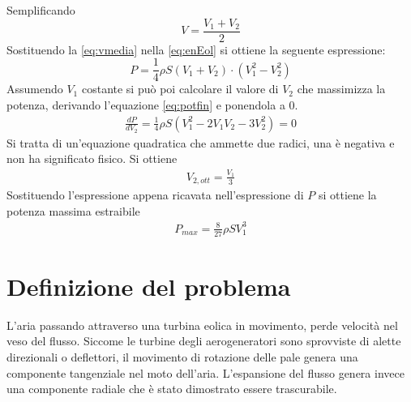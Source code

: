 Semplificando 
\begin{equation}\label{eq:vmedia}
V = \frac{V_1 + V_2}{2}
\end{equation}
Sostituendo la \ref{eq:vmedia} nella \ref{eq:enEol} si ottiene la seguente espressione:
\begin{equation}\label{eq:potfin}
P = \frac{1}{4} \rho S \left( V_1 +V_2 \right) \cdot \left(V_1^2 - V_2^2 \right)
\end{equation}
Assumendo $V_1$ costante si può poi calcolare il valore di $V_2$ che massimizza la potenza, derivando l'equazione \ref{eq:potfin} e ponendola a $0$. 
\begin{align*}
\frac{dP}{dV_2} = \frac{1}{4} \rho S \left( V_1^2 - 2 V_1 V_2 - 3 V_2^2 \right) = 0
\end{align*}
Si tratta di un'equazione quadratica che ammette due radici, una è negativa e non ha significato fisico. Si ottiene
\begin{align*}
V_{2,ott} = \frac{V_1}{3}
\end{align*}
Sostituendo l'espressione appena ricavata nell'espressione di $P$ si ottiene la potenza massima estraibile
\begin{align*}
P_{max} = \frac{8}{27} \rho S V_1^3 
\end{align*}

\section{Definizione del problema}
L'aria passando attraverso una turbina eolica in movimento, perde velocità nel veso del flusso. Siccome le turbine degli aerogeneratori sono sprovviste di alette direzionali o deflettori, il movimento di rotazione delle pale genera una componente tangenziale nel moto dell'aria. L'espansione del flusso genera invece una componente radiale che è stato dimostrato essere trascurabile. 

